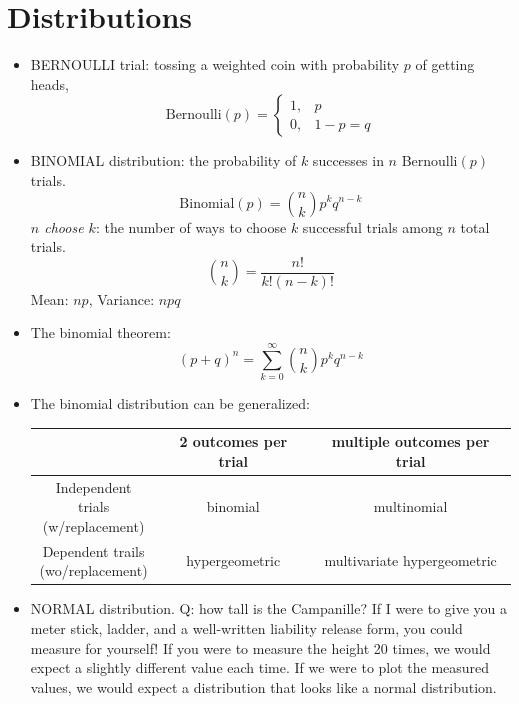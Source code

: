 \documentclass[12pt]{article}
\numberwithin{equation}{section}
\begin{document}
\section{Distributions}
\begin{itemize}
	\item BERNOULLI trial: tossing a weighted coin with probability $ p $ of getting heads,
	\begin{equation}
			\text{Bernoulli}(p)=\begin{cases}
				1,&p\\
				0,&1-p=q
			\end{cases}
	\end{equation}
	\item BINOMIAL distribution: the probability of $ k $ successes in $ n $ Bernoulli$ (p) $ trials.
	\begin{equation}
			\text{Binomial}(p) = {n \choose k} p^k q^{n-k}
	\end{equation}
	\textit{$ n $ choose $ k $}: the number of ways to choose $ k $ successful trials among $ n $  total trials.
	\begin{equation}
			{n\choose k} = \frac{n!}{k!(n-k)!}
	\end{equation}
	Mean: $ np $, Variance: $ npq $
	\item The binomial theorem:
	\begin{equation}
			(p+q)^n = \sum_{k=0}^\infty {n \choose k} p^k q^{n-k}
	\end{equation}

\item The binomial distribution can be generalized:

\begin{center}

\begin{tabular}{c|c|c}
	& \textbf{2 outcomes per trial} &\textbf{ multiple outcomes per trial}\\
	\midrule
	\shortstack{Independent trials\\(w/replacement)} & binomial & multinomial\\
	\midrule
	\shortstack{Dependent trails\\(wo/replacement)} & hypergeometric & multivariate hypergeometric
\end{tabular}
\end{center}

\item NORMAL distribution. Q: how tall is the Campanille? If I were to give you a meter stick, ladder, and a well-written liability release form, you could measure for yourself! If you were to measure the height 20 times, we would expect a slightly different value each time. If we were to plot the measured values, we would expect a distribution that looks like a normal distribution.


\end{itemize}
\end{document}
